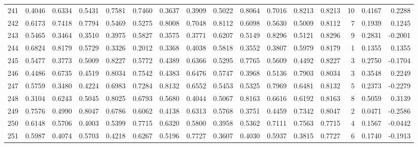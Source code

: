 \begin{tabular}{lrrrrrrrrrrrrrrr}
241 &      0.4046 &  0.6334 &  0.5431 &  0.7581 &  0.7460 &  0.3637 &  0.3909 &  0.5022 &  0.8064 &  0.7016 &   0.8213 &     0.8213 &     10 &                    0.4167 &                     0.2288 \\
242 &      0.6173 &  0.7418 &  0.7794 &  0.5469 &  0.5275 &  0.8008 &  0.7048 &  0.8112 &  0.6098 &  0.5630 &   0.5009 &     0.8112 &      7 &                    0.1939 &                     0.1245 \\
243 &      0.5465 &  0.3464 &  0.3510 &  0.3975 &  0.5827 &  0.3575 &  0.3771 &  0.6207 &  0.5149 &  0.8296 &   0.5121 &     0.8296 &      9 &                    0.2831 &                    -0.2001 \\
244 &      0.6824 &  0.8179 &  0.5729 &  0.3326 &  0.2012 &  0.3368 &  0.4038 &  0.5818 &  0.3552 &  0.3807 &   0.5979 &     0.8179 &      1 &                    0.1355 &                     0.1355 \\
245 &      0.5477 &  0.3773 &  0.5009 &  0.8227 &  0.5772 &  0.4389 &  0.6366 &  0.5295 &  0.7765 &  0.5609 &   0.4492 &     0.8227 &      3 &                    0.2750 &                    -0.1704 \\
246 &      0.4486 &  0.6735 &  0.4519 &  0.8034 &  0.7542 &  0.4383 &  0.6476 &  0.5747 &  0.3968 &  0.5136 &   0.7903 &     0.8034 &      3 &                    0.3548 &                     0.2249 \\
247 &      0.5759 &  0.3480 &  0.4224 &  0.6983 &  0.7284 &  0.8132 &  0.6552 &  0.5453 &  0.5325 &  0.7969 &   0.6481 &     0.8132 &      5 &                    0.2373 &                    -0.2279 \\
248 &      0.3104 &  0.6243 &  0.5045 &  0.8025 &  0.6793 &  0.5680 &  0.4044 &  0.5067 &  0.8163 &  0.6616 &   0.6192 &     0.8163 &      8 &                    0.5059 &                     0.3139 \\
249 &      0.7576 &  0.4990 &  0.8047 &  0.6786 &  0.6062 &  0.4138 &  0.6313 &  0.5768 &  0.3751 &  0.4459 &   0.7342 &     0.8047 &      2 &                    0.0471 &                    -0.2586 \\
250 &      0.6148 &  0.5706 &  0.4003 &  0.5399 &  0.7715 &  0.6320 &  0.5800 &  0.3958 &  0.5362 &  0.7111 &   0.7563 &     0.7715 &      4 &                    0.1567 &                    -0.0442 \\
251 &      0.5987 &  0.4074 &  0.5703 &  0.4218 &  0.6267 &  0.5196 &  0.7727 &  0.3607 &  0.4030 &  0.5937 &   0.3815 &     0.7727 &      6 &                    0.1740 &                    -0.1913 \\

\end{tabular}
